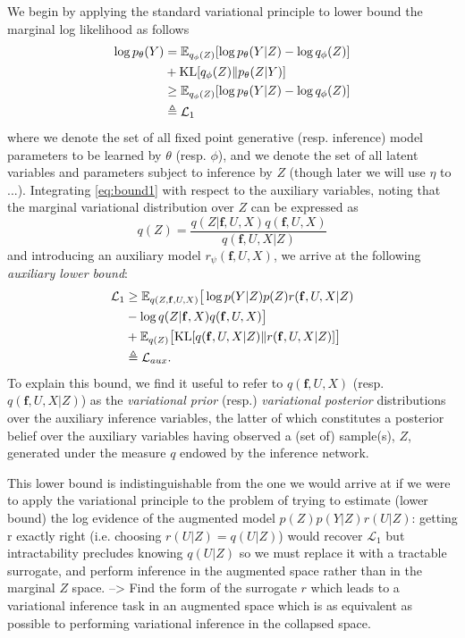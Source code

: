 \documentclass[]{article}
\newcommand{\fb}{\mathbf{f}}
\newcommand{\Ex}{\mathbb{E}}
\newcommand{\KL}{\mathrm{KL}}
\begin{document}
We begin by applying the standard variational principle to lower bound the marginal log likelihood as follows
%
\begin{align}
\log p_\theta(Y) &= \Ex_{q_\phi(Z)}[\log p_\theta(Y|Z) - \log q_\phi(Z)]\notag\\
&+ \text{KL}[q_\phi(Z)\Vert p_\theta(Z|Y)]\label{eq:var_principle}\\
&\geq \Ex_{q_\phi(Z)}[\log p_\theta(Y|Z) - \log q_\phi(Z)] \notag \\
&\triangleq \mathcal{L}_1 \label{eq:bound1}
\end{align}
%
where we denote the set of all fixed point generative (resp. inference) model parameters to be learned by $\theta$ (resp. $\phi$), and we denote the set of all latent variables and parameters subject to inference by $Z$ (though later we will use $\eta$ to ...).
Integrating \ref{eq:bound1} with respect to the auxiliary variables, noting that the marginal variational distribution over $Z$ can be expressed as
\begin{equation}
q(Z) = \frac{q(Z|\fb,U,X)q(\fb,U,X)}{q(\fb,U,X|Z)}
\end{equation}
%
and introducing an auxiliary model $r_\psi(\fb,U,X)$, we arrive at the following \emph{auxiliary lower bound}:
%
\begin{align}
\mathcal{L}_1 &\geq \Ex_{q(Z,\fb,U,X)}\big[ \log p(Y|Z)p(Z)r(\fb,U,X|Z) \notag \\
&- \log q(Z|\fb,X)q(\fb,U,X) \big] \notag \\
&+ \Ex_{q(Z)}\big[\KL[q(\fb,U,X|Z)\Vert r(\fb,U,X|Z)]\big] \label{eq:lowerlower} \\
&\triangleq \mathcal{L}_{aux}. \label{eq:L_aux}
\end{align}
%
To explain this bound, we find it useful to refer to $q(\fb,U,X)$ (resp. $q(\fb,U,X|Z)$) as the \emph{variational prior} (resp.) \emph{variational posterior} distributions over the auxiliary inference variables, the latter of which constitutes a posterior belief over the auxiliary variables having observed a (set of) sample(s), $Z$, generated under the measure $q$ endowed by the inference network.

This lower bound is indistinguishable from the one we would arrive at if we were to apply the variational principle to the problem of trying to estimate (lower bound) the log evidence of the augmented model $p(Z)p(Y|Z)r(U|Z)$: getting r exactly right (i.e. choosing $r(U|Z)=q(U|Z)$) would recover $\mathcal{L}_1$ but intractability precludes knowing $q(U|Z)$ so we must replace it with a tractable surrogate, and perform inference in the augmented space rather than in the marginal $Z$ space.
--> Find the form of the surrogate $r$ which leads to a variational inference task in an augmented space which is as equivalent as possible to performing variational inference in the collapsed space.
\end{document}
